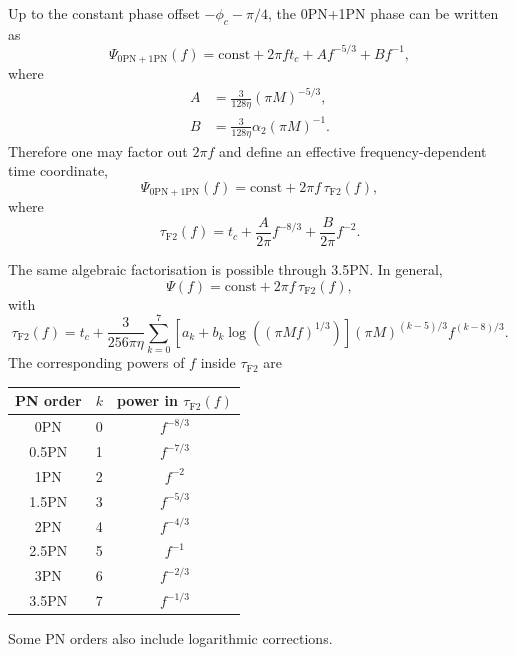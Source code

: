 \documentclass[11pt]{article}
\begin{document}
Up to the constant phase offset $-\phi_c - \pi/4$, the 0PN+1PN phase can be
written as
\begin{equation}
    \Psi_{\mathrm{0PN+1PN}}(f)
    =
    \mathrm{const}
    + 2\pi f t_c
    + A f^{-5/3}
    + B f^{-1},
\end{equation}
where
\begin{align}
    A &= \frac{3}{128\eta}(\pi M)^{-5/3}, \\
    B &= \frac{3}{128\eta}\alpha_2(\pi M)^{-1}.
\end{align}
Therefore one may factor out $2\pi f$ and define an effective
frequency-dependent time coordinate,
\begin{equation}
    \Psi_{\mathrm{0PN+1PN}}(f)
    =
    \mathrm{const}
    + 2\pi f \, \tau_{\mathrm{F2}}(f),
\end{equation}
where
\begin{equation}
    \tau_{\mathrm{F2}}(f)
    =
    t_c
    + \frac{A}{2\pi} f^{-8/3}
    + \frac{B}{2\pi} f^{-2}.
\end{equation}

The same algebraic factorisation is possible through 3.5PN. In general,
\begin{equation}
    \Psi(f)
    =
    \mathrm{const}
    + 2\pi f\,\tau_{\mathrm{F2}}(f),
\end{equation}
with
\begin{equation}
    \tau_{\mathrm{F2}}(f)
    =
    t_c
    + \frac{3}{256\pi\eta}
      \sum_{k=0}^{7}
      \left[a_k + b_k \log\left((\pi M f)^{1/3}\right)\right]
      (\pi M)^{(k-5)/3}
      f^{(k-8)/3}.
    \label{eq:tau_f2_factorised}
\end{equation}
The corresponding powers of $f$ inside $\tau_{\mathrm{F2}}$ are
\begin{center}
\begin{tabular}{c|c|c}
PN order & $k$ & power in $\tau_{\mathrm{F2}}(f)$ \\
\hline
0PN   & 0 & $f^{-8/3}$ \\
0.5PN & 1 & $f^{-7/3}$ \\
1PN   & 2 & $f^{-2}$ \\
1.5PN & 3 & $f^{-5/3}$ \\
2PN   & 4 & $f^{-4/3}$ \\
2.5PN & 5 & $f^{-1}$ \\
3PN   & 6 & $f^{-2/3}$ \\
3.5PN & 7 & $f^{-1/3}$
\end{tabular}
\end{center}
Some PN orders also include logarithmic corrections.
\end{document}
